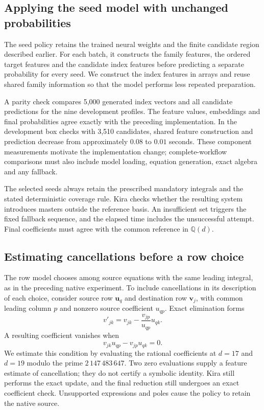 \subsection{Applying the seed model with unchanged probabilities}
The seed policy retains the trained neural weights and the finite candidate
region described earlier. For each batch, it constructs the family features,
the ordered target features and the candidate index features before predicting
a separate probability for every seed. We construct the index features in
arrays and reuse shared family information so that the model performs less
repeated preparation.

A parity check compares 5,000 generated index vectors and all candidate
predictions for the nine development profiles. The feature values, embeddings
and final probabilities agree exactly with the preceding implementation. In
the development box checks with 3,510 candidates, shared feature construction
and prediction decrease from approximately $0.08$ to $0.01$ seconds. These
component measurements motivate the implementation change; complete-workflow
comparisons must also include model loading, equation generation, exact algebra
and any fallback.

The selected seeds always retain the prescribed mandatory integrals and the
stated deterministic coverage rule. Kira checks whether the resulting system
introduces masters outside the reference basis. An insufficient set triggers
the fixed fallback sequence, and the elapsed time includes the unsuccessful
attempt. Final coefficients must agree with the common reference in
$\mathbb Q(d)$.

\subsection{Estimating cancellations before a row choice}
The row model chooses among source equations with the same leading integral,
as in the preceding native experiment. To include cancellations in its
description of each choice, consider source row $\boldsymbol u_q$ and
destination row $\boldsymbol v_j$, with common leading column $p$ and nonzero
source coefficient $u_{qp}$. Exact elimination forms
\[
 v'_{jk}=v_{jk}-\frac{v_{jp}}{u_{qp}}u_{qk}.
\]
A resulting coefficient vanishes when
\[
 v_{jk}u_{qp}-v_{jp}u_{qk}=0.
\]
We estimate this condition by evaluating the rational coefficients at
$d=17$ and $d=19$ modulo the prime $2\,147\,483\,647$. Two zero evaluations
supply a feature estimate of cancellation; they do not certify a symbolic
identity. Kira still performs the exact update, and the final reduction still
undergoes an exact coefficient check. Unsupported expressions and poles cause
the policy to retain the native source.

